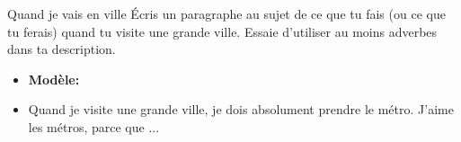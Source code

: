 \begin{frame}{Quand je vais en ville}
  Écris un paragraphe au sujet de ce que tu fais (ou ce que tu ferais) quand tu visite une grande ville.
  Essaie d'utiliser au moins  \alert{adverbes} dans ta description.
  \begin{itemize}
    \item[] \textbf{Modèle:}
    \item Quand je visite une grande ville, je dois \alert{absolument} prendre le métro. J'aime les métros, parce que ...
  \end{itemize}
\end{frame}